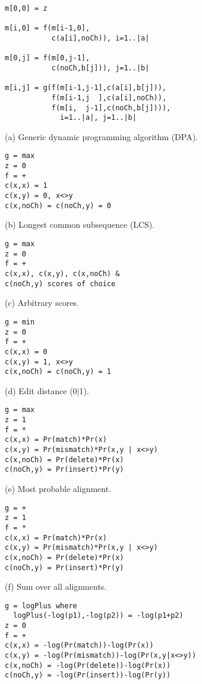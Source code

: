 \documentclass[letterpaper,11pt,oneside]{article}
\begin{document}
\begin{figure}
\begin{minipage}{\textwidth}
\begin{multicols}{2}

\footnotesize
\begin{verbatim}
m[0,0] = z

m[i,0] = f(m[i-1,0],
           c(a[i],noCh)), i=1..|a|

m[0,j] = f(m[0,j-1],
           c(noCh,b[j])), j=1..|b|

m[i,j] = g(f(m[i-1,j-1],c(a[i],b[j])),
           f(m[i-1,j  ],c(a[i],noCh)),
           f(m[i,  j-1],c(noCh,b[j]))),
             i=1..|a|, j=1..|b|
\end{verbatim}

(a) Generic dynamic programming algorithm (DPA).


\begin{verbatim}
g = max
z = 0
f = +
c(x,x) = 1
c(x,y) = 0, x<>y
c(x,noCh) = c(noCh,y) = 0
\end{verbatim}

(b) Longest common subsequence (LCS).


\begin{verbatim}
g = max
z = 0
f = +
c(x,x), c(x,y), c(x,noCh) &
c(noCh,y) scores of choice
\end{verbatim}

(c) Arbitrary scores.


\begin{verbatim}
g = min
z = 0
f = +
c(x,x) = 0
c(x,y) = 1, x<>y
c(x,noCh) = c(noCh,y) = 1
\end{verbatim}

(d) Edit distance (0$|$1).


\begin{verbatim}
g = max
z = 1
f = *
c(x,x) = Pr(match)*Pr(x)
c(x,y) = Pr(mismatch)*Pr(x,y | x<>y)
c(x,noCh) = Pr(delete)*Pr(x)
c(noCh,y) = Pr(insert)*Pr(y)
\end{verbatim}

(e) Most probable alignment.


\begin{verbatim}
g = +
z = 1
f = *
c(x,x) = Pr(match)*Pr(x)
c(x,y) = Pr(mismatch)*Pr(x,y | x<>y)
c(x,noCh) = Pr(delete)*Pr(x)
c(noCh,y) = Pr(insert)*Pr(y)
\end{verbatim}

(f) Sum over all alignments.


\begin{verbatim}
g = logPlus where
  logPlus(-log(p1),-log(p2)) = -log(p1+p2)
z = 0
f = +
c(x,x) = -log(Pr(match))-log(Pr(x))
c(x,y) = -log(Pr(mismatch))-log(Pr(x,y|x<>y))
c(x,noCh) = -log(Pr(delete))-log(Pr(x))
c(noCh,y) = -log(Pr(insert))-log(Pr(y))
\end{verbatim}


\end{multicols}
\end{minipage}
\end{figure}
\end{document}
